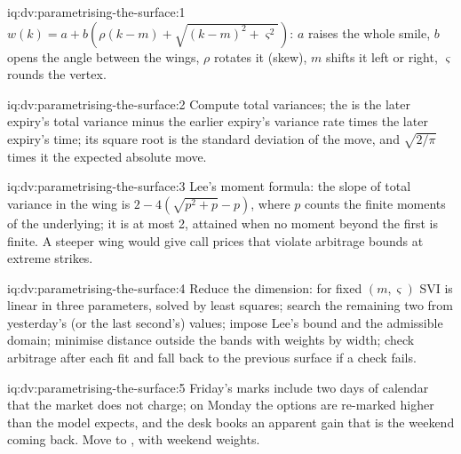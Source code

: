 \begin{solution}{iq:dv:parametrising-the-surface:1}
$w(k)=a+b(\rho(k-m)+\sqrt{(k-m)^2+\varsigma^2})$: $a$ raises the whole smile, $b$ opens the angle between
the wings, $\rho$ rotates it (skew), $m$ shifts it left or right, $\varsigma$ rounds the vertex.
\end{solution}

\begin{solution}{iq:dv:parametrising-the-surface:2}
Compute total variances; the  is the later expiry's total variance minus the earlier
expiry's variance rate times the later expiry's time; its square root is the standard deviation of the
move, and $\sqrt{2/\pi}$ times it the expected absolute move.
\end{solution}

\begin{solution}{iq:dv:parametrising-the-surface:3}
Lee's moment formula: the slope of total variance in the wing is $2-4(\sqrt{p^2+p}-p)$, where $p$ counts
the finite moments of the underlying; it is at most 2, attained when no moment beyond the first is
finite. A steeper wing would give call prices that violate arbitrage bounds at extreme strikes.
\end{solution}

\begin{solution}{iq:dv:parametrising-the-surface:4}
Reduce the dimension: for fixed $(m,\varsigma)$ SVI is linear in three parameters, solved by least squares;
search the remaining two from yesterday's (or the last second's) values; impose Lee's bound and the
admissible domain; minimise distance outside the bands with weights by width; check arbitrage after each
fit and fall back to the previous surface if a check fails.
\end{solution}

\begin{solution}{iq:dv:parametrising-the-surface:5}
Friday's marks include two days of calendar  that the market does not charge; on Monday the
options are re-marked higher than the model expects, and the desk books an apparent  gain that is
the weekend  coming back. Move to , with weekend weights.
\end{solution}

